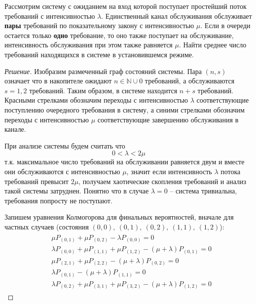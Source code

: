 \documentclass[12pt,a4paper]{article}
\author{Самутичев Е.Р.}
\date{\today}
\title{}
\newcommand{\incfig}[1]{%
	\def\svgwidth{\columnwidth}
	{#1.pdf_tex}
}
\begin{document}
	
\maketitle

\begin{exercise}[Задача 8]
	Рассмотрим систему с ожиданием на вход которой поступает простейший поток требований с интенсивностью $\lambda$. Единственный канал обслуживания обслуживает \textbf{пары} требований по показательному закону с интенсивностью $\mu$. Если в очереди остается только \textbf{одно} требование, то оно также поступает на обслуживание, интенсивность обслуживания при этом также равняется $\mu$. Найти среднее число требований находящихся в системе в установившемся режиме. 
\end{exercise}
\begin{proof}[Решение]
	Изобразим размеченный граф состояний системы. Пара $(n, s)$ означает что в накопителе ожидают $n \in \mathbb{N}\cup{0}$ требований, а обслуживаются $s = 1, 2$ требований. Таким образом, в системе находится $n + s$ требований. {\color{red}Красными} стрелками обозначим переходы с интенсивностью {\color{red}$\lambda$} соответствующие поступлению очередного требования в систему, а {\color{blue}синими} стрелками обозначим переходы с интенсивностью {\color{blue}$\mu$} соответствующие завершению обслуживания в канале.
	\begin{figure}[h!]
		\centering
		\scalebox{0.8}{\incfig{4}}
	\end{figure}

	При анализе системы будем считать что
	\begin{equation*}
		0 < \lambda < 2\mu
	\end{equation*}
	т.к. максимальное число требований на обслуживании равняется двум и вместе они обслуживаются с интенсивностью $\mu$, значит если интенсивность $\lambda$ потока требований превысит $2\mu$, получаем хаотические скопления требований и анализ такой системы затруднен. Понятно что в случае $\lambda = 0$ -- система тривиальна, требования попросту не поступают.
	
	Запишем уравнения Колмогорова для финальных вероятностей, вначале для частных случаев (состояния $(0, 0), \ (0, 1), \ (0, 2), \ (1, 1), \ (1, 2)$):
	\begin{align}\label{eq:1}
	\begin{split}
		&\mu P_{(0, 1)} + \mu P_{(0, 2)} - \lambda P_{(0, 0)} = 0 \\
		&\lambda P_{(0, 0)} + \mu P_{(1, 1)} + \mu P_{(1, 2)} - (\mu + \lambda) P_{(0, 1)} = 0 \\
		&\mu P_{(2, 1)} + \mu P_{(2, 2)} - (\mu + \lambda) P_{(0, 2)} = 0 \\
		&\lambda P_{(0, 1)} - (\mu + \lambda) P_{(1, 1)} = 0 \\
		&\lambda P_{(0, 2)} + \mu P_{(3, 1)} + \mu P_{(3, 2)} - (\mu + \lambda) P_{(1, 2)} = 0 
	\end{split}
	\end{align}
	

\end{proof}
\end{document}
